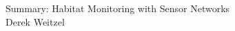 \documentclass[12pt]{article}
\begin{document}
\begin{center}
{\huge Summary: Habitat Monitoring with Sensor Networks } \\
Derek Weitzel
\end{center}
\end{document}
